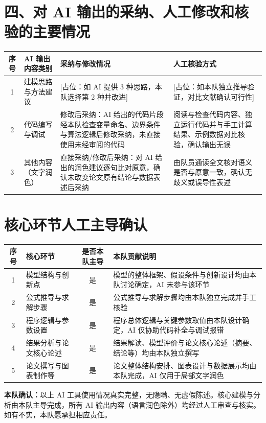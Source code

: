 \documentclass[12pt, a4paper, scheme=chinese, fontset=windows]{ctexart}
\begin{document}
\bigskip

\section*{四、对 AI 输出的采纳、人工修改和核验的主要情况}

\begin{longtable}{cp{3.4cm}p{4.6cm}p{4.6cm}}
\toprule
序号 & AI 输出内容类别 & 采纳与修改情况 & 人工核验方式 \\
\midrule
\endhead
1 & 建模思路与方法建议 & [占位：如 AI 提供 3 种思路，本队选择第 2 种并改进] & [占位：如本队独立推导验证，对比文献确认可行性] \\
2 & 代码编写与调试 & 修改后采纳：AI 给出的代码片段经本队检查变量命名、边界条件与算法逻辑后修改采纳，未直接使用未经审阅的代码 & 阅读与检查代码内容、独立运行代码并与手工计算结果、示例数据对比核验，确认输出无误 \\
3 & 其他内容（文字润色） & 直接采纳/修改后采纳：对 AI 给出的润色建议逐句比对原意，确认未改变论文原有结论与数据表述后采纳 & 由队员通读全文核对语义是否与原意一致，确认无歧义或误导性表述 \\
\bottomrule
\end{longtable}

\section*{核心环节人工主导确认}

\begin{longtable}{cp{3.6cm}cp{5cm}}
\toprule
序号 & 核心环节 & 是否本队主导 & 本队贡献说明 \\
\midrule
\endhead
1 & 模型结构与创新点 & 是 & 模型的整体框架、假设条件与创新设计均由本队讨论确定，AI 未参与该环节 \\
2 & 公式推导与求解步骤 & 是 & 公式推导与求解步骤均由本队独立完成并手工核验 \\
3 & 程序逻辑与参数设置 & 是 & 程序总体逻辑与关键参数取值由本队设计确定，AI 仅协助代码补全与调试报错 \\
4 & 结果分析与论文核心论述 & 是 & 结果解读、模型评价与论文核心论述（摘要、结论等）均由本队独立撰写 \\
5 & 论文撰写与图表制作等 & 是 & 论文整体结构安排、图表设计与数据展示均由本队完成，AI 仅用于局部文字润色 \\
\bottomrule
\end{longtable}

\bigskip
\noindent\textbf{本队确认：}以上 AI 工具使用情况真实完整，无隐瞒、无虚假陈述。核心建模与分析由本队主导完成，所有 AI 输出内容（语言润色除外）均经过人工审查与核实。如有不实，本队愿承担相应责任。
\end{document}

